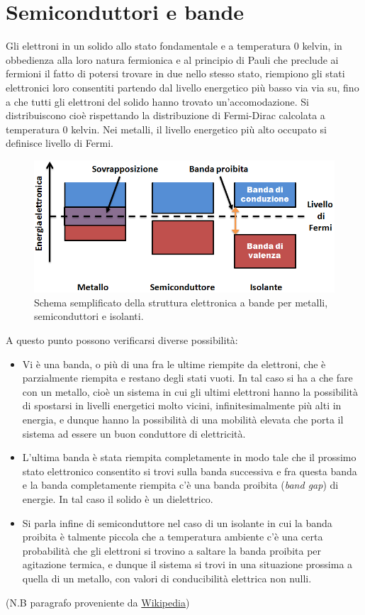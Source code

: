 \documentclass[
]{book}
\providecommand{\tightlist}{%
  \setlength{\itemsep}{0pt}\setlength{\parskip}{0pt}}
\begin{document}
\section{Semiconduttori e bande}\label{semiconduttori-e-bande}

Gli elettroni in un solido allo stato fondamentale e a temperatura \(0\)
kelvin, in obbedienza alla loro natura fermionica e al principio di
Pauli che preclude ai fermioni il fatto di potersi trovare in due nello
stesso stato, riempiono gli stati elettronici loro consentiti partendo
dal livello energetico più basso via via su, fino a che tutti gli
elettroni del solido hanno trovato un'accomodazione. Si distribuiscono
cioè rispettando la distribuzione di Fermi-Dirac calcolata a temperatura
0 kelvin. Nei metalli, il livello energetico più alto occupato si
definisce livello di Fermi.

\begin{figure}
\centering
\includegraphics[width=0.5\linewidth,height=\textheight,keepaspectratio]{immagini/bande.png}
\caption{Schema semplificato della struttura elettronica a bande per
metalli, semiconduttori e isolanti.}
\end{figure}

A questo punto possono verificarsi diverse possibilità:

\begin{itemize}
\tightlist
\item
  Vi è una banda, o più di una fra le ultime riempite da elettroni, che
  è parzialmente riempita e restano degli stati vuoti. In tal caso si ha
  a che fare con un metallo, cioè un sistema in cui gli ultimi elettroni
  hanno la possibilità di spostarsi in livelli energetici molto vicini,
  infinitesimalmente più alti in energia, e dunque hanno la possibilità
  di una mobilità elevata che porta il sistema ad essere un buon
  conduttore di elettricità.
\item
  L'ultima banda è stata riempita completamente in modo tale che il
  prossimo stato elettronico consentito si trovi sulla banda successiva
  e fra questa banda e la banda completamente riempita c'è una banda
  proibita (\emph{band gap}) di energie. In tal caso il solido è un
  dielettrico.
\item
  Si parla infine di semiconduttore nel caso di un isolante in cui la
  banda proibita è talmente piccola che a temperatura ambiente c'è una
  certa probabilità che gli elettroni si trovino a saltare la banda
  proibita per agitazione termica, e dunque il sistema si trovi in una
  situazione prossima a quella di un metallo, con valori di
  conducibilità elettrica non nulli.
\end{itemize}

(N.B paragrafo proveniente da
\href{https://it.wikipedia.org/wiki/Struttura_elettronica_a_bande}{Wikipedia})

\backmatter
\end{document}
